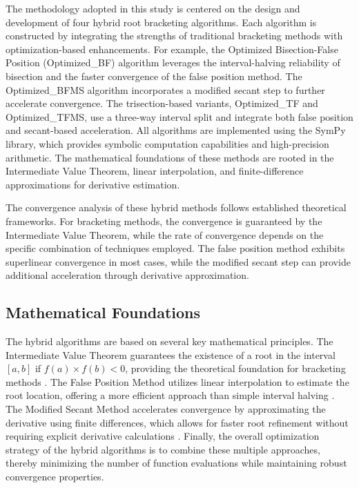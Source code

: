 \documentclass[amsmath, amssymb, aps]{revtex4-2}
\begin{document}
The methodology adopted in this study is centered on the design and development of four hybrid root bracketing algorithms. Each algorithm is constructed by integrating the strengths of traditional bracketing methods with optimization-based enhancements. For example, the Optimized Bisection-False Position (Optimized\_BF) algorithm leverages the interval-halving reliability of bisection and the faster convergence of the false position method. The Optimized\_BFMS algorithm incorporates a modified secant step to further accelerate convergence. The trisection-based variants, Optimized\_TF and Optimized\_TFMS, use a three-way interval split and integrate both false position and secant-based acceleration. All algorithms are implemented using the SymPy library, which provides symbolic computation capabilities and high-precision arithmetic. The mathematical foundations of these methods are rooted in the Intermediate Value Theorem, linear interpolation, and finite-difference approximations for derivative estimation.

The convergence analysis of these hybrid methods follows established theoretical frameworks. For bracketing methods, the convergence is guaranteed by the Intermediate Value Theorem, while the rate of convergence depends on the specific combination of techniques employed. The false position method exhibits superlinear convergence in most cases, while the modified secant step can provide additional acceleration through derivative approximation.

\subsection{Mathematical Foundations}

The hybrid algorithms are based on several key mathematical principles. The Intermediate Value Theorem guarantees the existence of a root in the interval $[a, b]$ if $f(a) \times f(b) < 0$, providing the theoretical foundation for bracketing methods \cite{burden1985numerical}. The False Position Method utilizes linear interpolation to estimate the root location, offering a more efficient approach than simple interval halving \cite{harder2019numerical}. The Modified Secant Method accelerates convergence by approximating the derivative using finite differences, which allows for faster root refinement without requiring explicit derivative calculations \cite{mathews2004numerical}. Finally, the overall optimization strategy of the hybrid algorithms is to combine these multiple approaches, thereby minimizing the number of function evaluations while maintaining robust convergence properties.
\end{document}

